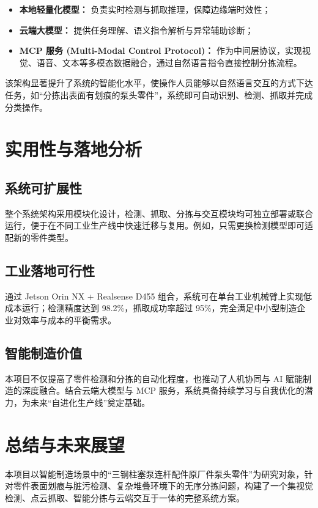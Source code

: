 \documentclass{cumcmthesis}
\begin{document}
\begin{itemize}
    \item \textbf{本地轻量化模型：} 负责实时检测与抓取推理，保障边缘端时效性；
    \item \textbf{云端大模型：} 提供任务理解、语义指令解析与异常辅助诊断；
    \item \textbf{MCP 服务 (Multi-Modal Control Protocol)：} 作为中间层协议，实现视觉、语音、文本等多模态数据融合，通过自然语言指令直接控制分拣流程。
\end{itemize}

该架构显著提升了系统的智能化水平，使操作人员能够以自然语言交互的方式下达任务，如“分拣出表面有划痕的泵头零件”，系统即可自动识别、检测、抓取并完成分类操作。

\section{实用性与落地分析}

\subsection{系统可扩展性}
整个系统架构采用模块化设计，检测、抓取、分拣与交互模块均可独立部署或联合运行，便于在不同工业生产线中快速迁移与复用。例如，只需更换检测模型即可适配新的零件类型。

\subsection{工业落地可行性}
通过 Jetson Orin NX + Realsense D455 组合，系统可在单台工业机械臂上实现低成本运行；检测精度达到 98.2\%，抓取成功率超过 95\%，完全满足中小型制造企业对效率与成本的平衡需求。

\subsection{智能制造价值}
本项目不仅提高了零件检测和分拣的自动化程度，也推动了人机协同与 AI 赋能制造的深度融合。结合云端大模型与 MCP 服务，系统具备持续学习与自我优化的潜力，为未来“自进化生产线”奠定基础。



\section{总结与未来展望}

本项目以智能制造场景中的“三钢柱塞泵连杆配件原厂件泵头零件”为研究对象，针对零件表面划痕与脏污检测、复杂堆叠环境下的无序分拣问题，构建了一个集视觉检测、点云抓取、智能分拣与云端交互于一体的完整系统方案。
\end{document}
